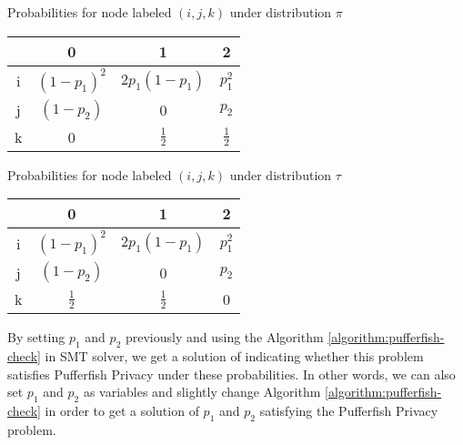 \begin{minipage}{\textwidth}
\begin{minipage}[t]{0.43\textwidth} 
 \centering
  \makeatletter{}\makeatother\caption{Probabilities for node labeled $(i,j,k)$ under distribution $\pi$ }
  \label{table:pi}
   \begin{tabular}{c|ccc}
& 0 & 1 & 2 \\
      \hline
      i
      & $(1-p_1)^2$
      & $2p_1(1-p_1)$
      & $p_1^2$
      \\
      j
      & $(1-p_2)$
      & 0
      & $p_2$
      \\
      k
      & 0
      & $\frac{1}{2}$
      & $\frac{1}{2}$
\end{tabular}
\end{minipage}
\begin{minipage}[t]{0.43\textwidth}
\centering
  \makeatletter{}\makeatother\caption{Probabilities for node labeled $(i,j,k)$ under distribution $\tau$ }
  \label{table:tau}

   \begin{tabular}{c|ccc}
& 0 & 1 & 2 \\
      \hline
      i
      & $(1-p_1)^2$
      & $2p_1(1-p_1)$
      & $p_1^2$
      \\
      j
      & $(1-p_2)$
      & 0
      & $p_2$
      \\
      k
      & $\frac{1}{2}$
      & $\frac{1}{2}$
      & 0
\end{tabular}
\end{minipage}
\end{minipage}

By setting $p_1$ and $p_2$ previously and using the Algorithm \ref{algorithm:pufferfish-check} in SMT solver, we get a solution
of indicating whether this problem satisfies Pufferfish Privacy under these probabilities.
In other words, we can also set $p_1$ and $p_2$ as variables and slightly change Algorithm \ref{algorithm:pufferfish-check}
in order to get a solution of $p_1$ and $p_2$ satisfying the Pufferfish Privacy problem.

